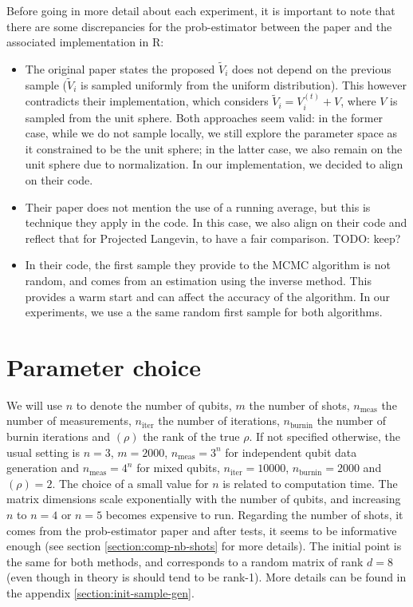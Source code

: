 \documentclass[12pt]{memoir}
\newcommand{\nmeasn}[1]{$n_{\text{meas}}=#1$}
\newcommand{\nitern}[1]{$n_{\text{iter}}=#1$}
\newcommand{\nburninn}[1]{$n_{\text{burnin}}=#1$}
\newcommand{\rhorankn}[1]{\text{rank}$(\rho)=#1$}
\newcommand{\nmeas}[0]{$n_{\text{meas}} $ }
\newcommand{\niter}[0]{$n_{\text{iter}} $ }
\newcommand{\nburnin}[0]{$n_{\text{burnin}} $ }
\newcommand{\rhorank}[0]{\text{rank}$(\rho) $ }
\begin{document}
Before going in more detail about each experiment, it is important to note that there are some discrepancies for the prob-estimator between the paper and the associated implementation in R:
\begin{itemize}
\item The original paper states the proposed $\tilde V_i$ does not depend on the previous sample ($\tilde V_i$ is sampled uniformly from the uniform distribution). This however contradicts their implementation, which considers $\tilde V_i = V_i^{(t)} + V$, where $V$ is sampled from the unit sphere. Both approaches seem valid: in the former case, while we do not sample locally, we still explore the parameter space as it constrained to be the unit sphere; in the latter case, we also remain on the unit sphere due to normalization. In our implementation, we decided to align on their code.
\item Their paper does not mention the use of a running average, but this is technique they apply in the code. In this case, we also align on their code and reflect that for Projected Langevin, to have a fair comparison. TODO: keep?
\item In their code, the first sample they provide to the MCMC algorithm is not random, and comes from an estimation using the inverse method. This provides a warm start and can affect the accuracy of the algorithm. In our experiments, we use a the same random first sample for both algorithms. 
\end{itemize}


\section{Parameter choice}
We will use $n$ to denote the number of qubits, $m$ the number of shots, \nmeas the number of measurements, \niter the number of iterations, \nburnin the number of burnin iterations and \rhorank the rank of the true $\rho$. If not specified otherwise, the usual setting is $n=3$, $m=2000$, \nmeasn{3^n} for independent qubit data generation and \nmeasn{4^n} for mixed qubits, \nitern{10000}, \nburninn{2000} and \rhorankn{2}. The choice of a small value for $n$ is related to computation time. The matrix dimensions scale exponentially with the number of qubits, and increasing $n$ to $n=4$ or $n=5$ becomes expensive to run. Regarding the number of shots, it comes from the prob-estimator paper and after tests, it seems to be informative enough (see section \ref{section:comp-nb-shots} for more details). The initial point is the same for both methods, and corresponds to a random matrix of rank $d=8$ (even though in theory is should tend to be rank-1). More details can be found in the appendix \ref{section:init-sample-gen}.\medbreak
\end{document}
